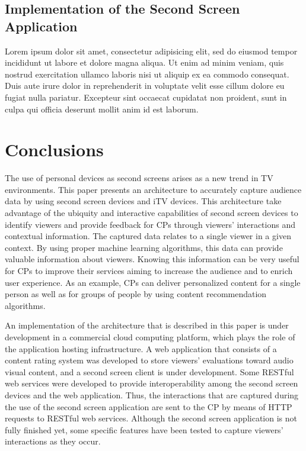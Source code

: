 \documentclass[journal]{IEEEtran}
\begin{document}
\subsection{Implementation of the Second Screen Application}

Lorem ipsum dolor sit amet, consectetur adipisicing elit, sed do eiusmod
tempor incididunt ut labore et dolore magna aliqua. Ut enim ad minim veniam,
quis nostrud exercitation ullamco laboris nisi ut aliquip ex ea commodo
consequat. Duis aute irure dolor in reprehenderit in voluptate velit esse
cillum dolore eu fugiat nulla pariatur. Excepteur sint occaecat cupidatat non
proident, sunt in culpa qui officia deserunt mollit anim id est laborum.

\section{Conclusions}
\label{sec_conclusions}

The use of personal devices as second screens arises as a new trend in TV environments. This paper presents an architecture to accurately capture audience data by using second screen devices and iTV devices. This architecture take advantage of the ubiquity and interactive capabilities of second screen devices to identify viewers and provide feedback for CPs through viewers' interactions and contextual information. The captured data relates to a single viewer in a given context. By using proper machine learning algorithms, this data can provide valuable information about viewers. Knowing this information can be very useful for CPs to improve their services aiming to increase the audience and to enrich user experience. As an example, CPs can deliver personalized content for a single person as well as for groups of people by using content recommendation algorithms.

An implementation of the architecture that is described in this paper is under development in a commercial cloud computing platform, which plays the role of the application hosting infrastructure. A web application that consists of a content rating system was developed to store  viewers' evaluations toward audio visual content, and a second screen client is under development. Some RESTful web services were developed to provide interoperability among the second screen devices and the web application. Thus, the interactions that are captured during the use of the second screen application are sent to the CP by means of HTTP requests to RESTful web services. Although the second screen application is not fully finished yet, some specific features have been tested to capture viewers' interactions as they occur.
\end{document}
